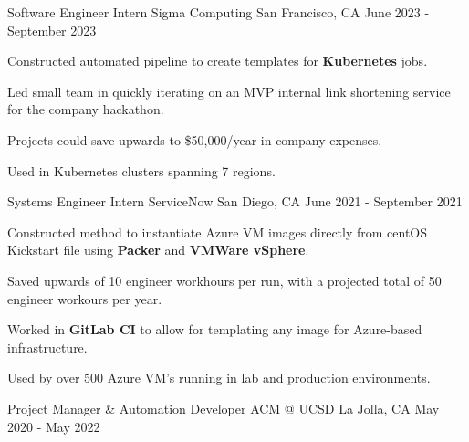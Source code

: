 \begin{cventries}
  \cventry
    {Software Engineer Intern}
    {Sigma Computing}
    {San Francisco, CA}
    {June 2023 - September 2023}
    {
      \begin{cvitems}
        \item {Constructed automated pipeline to create templates for \textbf{Kubernetes} jobs.}
        \item {Led small team in quickly iterating on an MVP internal link shortening service for the company hackathon.}
        \item {Projects could save upwards to \$50,000/year in company expenses.}
        \item {Used in Kubernetes clusters spanning 7 regions.}
      \end{cvitems}
    }
  \cventry
    {Systems Engineer Intern}
    {ServiceNow}
    {San Diego, CA}
    {June 2021 - September 2021}
    {
      \begin{cvitems}
        \item {Constructed method to instantiate Azure VM images directly from centOS Kickstart file using \textbf{Packer} and \textbf{VMWare vSphere}.}
        \item {Saved upwards of 10 engineer workhours per run, with a projected total of 50 engineer workours per year.}
        \item {Worked in \textbf{GitLab CI} to allow for templating any image for Azure-based infrastructure.}
        \item {Used by over 500 Azure VM's running in lab and production environments.}
      \end{cvitems}
    }
  \cventry
  {Project Manager \& Automation Developer}
  {ACM @ UCSD}
  {La Jolla, CA}
  {May 2020 - May 2022}
  {
    \begin{cvitems}

\end{cvitems}}
\end{cventries}
